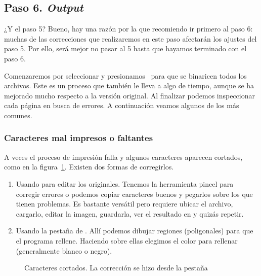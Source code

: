 \documentclass[%
	a5paper,
	10pt,
	twoside,
	openright,
	final,
]{memoir}
\begin{document}
	\subsection{Paso 6. \emph{Output}\label{sec:SToutput}} ¿Y el paso 5? Bueno, hay una razón por la que recomiendo ir primero al paso 6: muchas de las correcciones que realizaremos en este paso afectarán los ajustes del paso 5. Por ello, será mejor no pasar al 5 hasta que hayamos terminado con el paso 6.

	Comenzaremos por seleccionar  y presionamos \play\ para que se binaricen todos los archivos. Este es un proceso que también le lleva a \scantailorAdvanced algo de tiempo, aunque se ha mejorado mucho respecto a la versión original. Al finalizar podemos inspeccionar cada página en busca de errores. A continuación veamos algunos de los más comunes.

	\subsubsection{Caracteres mal impresos o faltantes} A veces el proceso de impresión falla y algunos caracteres aparecen cortados, como en la figura~\ref{fig:SToutputBadChars}. Existen dos formas de corregirlos.
	\begin{enumerate}
		\item Usando \gimp para editar los originales. Tenemos la herramienta pincel para corregir errores o podemos copiar caracteres buenos y pegarlos sobre los que tienen problemas. Es bastante versátil pero requiere ubicar el archivo, cargarlo, editar la imagen, guardarla, ver el resultado en \scantailor y quizás repetir. %
		\item Usando la pestaña  de \scantailor. Allí podemos dibujar regiones (poligonales) para que el programa rellene. Haciendo  sobre ellas elegimos el color para rellenar (generalmente blanco o negro).
	\end{enumerate}

	\begin{figure}
		\hfill
		\hfill
		\caption[Caracteres cortados]{Caracteres cortados. La corrección se hizo desde la pestaña \label{fig:SToutputBadChars}}
	\end{figure}
\end{document}

